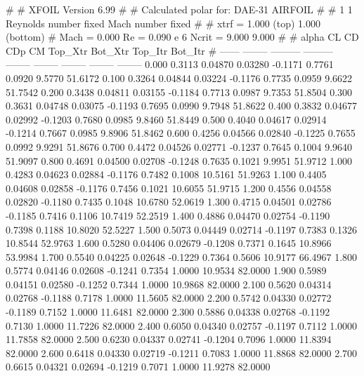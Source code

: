 #  
#       XFOIL         Version 6.99
#  
# Calculated polar for: DAE-31 AIRFOIL                                  
#  
# 1 1 Reynolds number fixed          Mach number fixed         
#  
# xtrf =   1.000 (top)        1.000 (bottom)  
# Mach =   0.000     Re =     0.090 e 6     Ncrit =   9.000  9.000
#  
#   alpha    CL        CD       CDp       CM     Top_Xtr  Bot_Xtr  Top_Itr  Bot_Itr
#  ------ -------- --------- --------- -------- -------- -------- -------- --------
   0.000   0.3113   0.04870   0.03280  -0.1171   0.7761   0.0920   9.5770  51.6172
   0.100   0.3264   0.04844   0.03224  -0.1176   0.7735   0.0959   9.6622  51.7542
   0.200   0.3438   0.04811   0.03155  -0.1184   0.7713   0.0987   9.7353  51.8504
   0.300   0.3631   0.04748   0.03075  -0.1193   0.7695   0.0990   9.7948  51.8622
   0.400   0.3832   0.04677   0.02992  -0.1203   0.7680   0.0985   9.8460  51.8449
   0.500   0.4040   0.04617   0.02914  -0.1214   0.7667   0.0985   9.8906  51.8462
   0.600   0.4256   0.04566   0.02840  -0.1225   0.7655   0.0992   9.9291  51.8676
   0.700   0.4472   0.04526   0.02771  -0.1237   0.7645   0.1004   9.9640  51.9097
   0.800   0.4691   0.04500   0.02708  -0.1248   0.7635   0.1021   9.9951  51.9712
   1.000   0.4283   0.04623   0.02884  -0.1176   0.7482   0.1008  10.5161  51.9263
   1.100   0.4405   0.04608   0.02858  -0.1176   0.7456   0.1021  10.6055  51.9715
   1.200   0.4556   0.04558   0.02820  -0.1180   0.7435   0.1048  10.6780  52.0619
   1.300   0.4715   0.04501   0.02786  -0.1185   0.7416   0.1106  10.7419  52.2519
   1.400   0.4886   0.04470   0.02754  -0.1190   0.7398   0.1188  10.8020  52.5227
   1.500   0.5073   0.04449   0.02714  -0.1197   0.7383   0.1326  10.8544  52.9763
   1.600   0.5280   0.04406   0.02679  -0.1208   0.7371   0.1645  10.8966  53.9984
   1.700   0.5540   0.04225   0.02648  -0.1229   0.7364   0.5606  10.9177  66.4967
   1.800   0.5774   0.04146   0.02608  -0.1241   0.7354   1.0000  10.9534  82.0000
   1.900   0.5989   0.04151   0.02580  -0.1252   0.7344   1.0000  10.9868  82.0000
   2.100   0.5620   0.04314   0.02768  -0.1188   0.7178   1.0000  11.5605  82.0000
   2.200   0.5742   0.04330   0.02772  -0.1189   0.7152   1.0000  11.6481  82.0000
   2.300   0.5886   0.04338   0.02768  -0.1192   0.7130   1.0000  11.7226  82.0000
   2.400   0.6050   0.04340   0.02757  -0.1197   0.7112   1.0000  11.7858  82.0000
   2.500   0.6230   0.04337   0.02741  -0.1204   0.7096   1.0000  11.8394  82.0000
   2.600   0.6418   0.04330   0.02719  -0.1211   0.7083   1.0000  11.8868  82.0000
   2.700   0.6615   0.04321   0.02694  -0.1219   0.7071   1.0000  11.9278  82.0000
